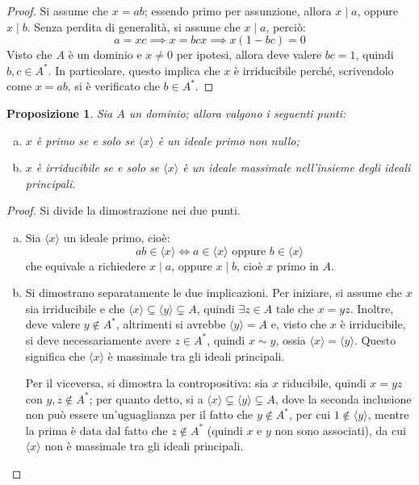 \documentclass[12pt]{scrartcl}
\theoremstyle{style}
\newtheorem{prop}{Proposizione}[section]
\numberwithin{equation}{subsection}
\begin{document}
	\begin{proof}
	Si assume che $x = ab$; essendo primo per assunzione, allora $x \mid a$, oppure $x  \mid b$.
	Senza perdita di generalit\`a, si assume che $x  \mid a$, perci\`o:
	\[
	a = xc \implies x= bcx\implies x(1-bc) = 0
	\] 
	Visto che $A$ \`e un dominio e $x \neq 0$ per ipotesi, allora deve valere $bc = 1$, quindi $b,c \in A^*$.
	In particolare, questo implica che $x$ \`e irriducibile perch\'e, scrivendolo come $x = ab$, si \`e verificato che $b \in A^*$.
	\end{proof}
\begin{prop}\label{prid}
	Sia $A$ un dominio; allora valgono i seguenti punti:
	\begin{enumerate}[(a).]
		\item $x$ \`e primo se e solo se $\langle x \rangle$ \`e un ideale primo non nullo;
		\item $x$ \`e irriducibile se e solo se $\langle x \rangle$ \`e un ideale massimale nell'insieme degli ideali principali.
	\end{enumerate}
\end{prop}
	\begin{proof}
		Si divide la dimostrazione nei due punti.
		\begin{enumerate}[(a).]
			\item Sia $\langle x \rangle$ un ideale primo, cio\`e:
		\[
		ab \in \langle x \rangle \iff a \in \langle x \rangle \text{ oppure } b \in \langle x \rangle
		\] 
		che equivale a richiedere $x  \mid a$, oppure $x \mid b$, cio\`e $x$ primo in $A$.
	\item Si dimostrano separatamente le due implicazioni.
Per iniziare, si assume che $x$ sia irriducibile e che $\langle x \rangle\subseteq \langle y \rangle\subsetneq A$, quindi $\exists z \in A$ tale che $x = yz$. 
Inoltre, deve valere $y \not\in A^*$, altrimenti si avrebbe $\langle y \rangle= A$ e, visto che $x$ \`e irriducibile, si deve necessariamente avere $z \in A^*$, quindi $x\sim y$, ossia $\langle x \rangle = \langle y \rangle$.
Questo significa che $\langle x \rangle$ \`e massimale tra gli ideali principali.

Per il viceversa, si dimostra la contropositiva: sia $x$ riducibile, quindi $x = yz$ con $y,z \not \in A^*$; per quanto detto, si a $\langle x \rangle\subsetneq \langle y \rangle\subsetneq A$, dove la seconda inclusione non pu\`o essere un'uguaglianza per il fatto che $y\not \in A^*$, per cui $1\not \in \langle y \rangle$, mentre la prima \`e data dal fatto che $z \not \in A^*$ (quindi $x$ e $y$ non sono associati), da cui $\langle x \rangle$ non \`e massimale tra gli ideali principali.
		\end{enumerate}
	\end{proof}
\end{document}
